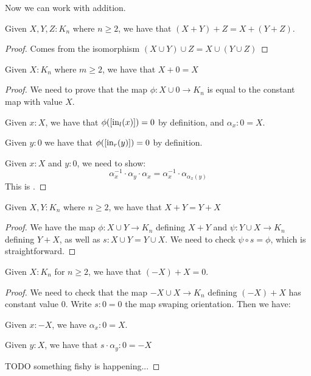 Now we can work with addition.

\begin{lemma}
Given $X,Y,Z:K_n$ where $n\geq 2$, we have that $(X+Y)+Z = X+(Y+Z)$.
\end{lemma}

\begin{proof}
Comes from the isomorphism $(X\cup Y) \cup Z = X\cup (Y\cup Z)$
\end{proof}

\begin{lemma}
Given $X:K_{n}$ where $m\geq 2$, we have that $X+0 = X$
\end{lemma}

\begin{proof}
We need to prove that the map $\phi : X\cup 0 \to K_n$ is equal to the constant map with value $X$.

Given $x:X$, we have that $\phi([\mathrm{in}_l(x)]) = 0$ by definition, and $\alpha_x:0=X$.

Given $y:0$ we have that $\phi([\mathrm{in}_r(y)]) = 0$ by definition.

Given $x:X$ and $y:0$, we need to show:
\[\alpha_x^{-1}\cdot \alpha_y\cdot \alpha_x = \alpha_x^{-1}\cdot \alpha_{\alpha_x(y)}\]
This is .
\end{proof}

\begin{lemma}
Given $X,Y:K_{n}$ where $n\geq 2$, we have that $X+Y = Y+X$
\end{lemma}

\begin{proof}
We have the map $\phi : X\cup Y\to K_n$ defining $X+Y$ and $\psi:Y\cup X\to K_n$ defining $Y+X$, as well as $s:X\cup Y = Y\cup X$. We need to check $\psi\circ s = \phi$, which is straightforward.
\end{proof}

\begin{lemma}
Given $X:K_n$ for $n\geq 2$, we have that $(-X)+X = 0$.
\end{lemma}

\begin{proof}
We need to check that the map $-X\cup X \to K_n$ defining $(-X)+X$ has constant value $0$. Write $s : 0 = 0$ the map swaping orientation. Then we have:

Given $x:-X$, we have $\alpha_x:0=X$.

Given $y:X$, we have that $s\cdot \alpha_y:0=-X$

TODO something fishy is happening...
\end{proof}

